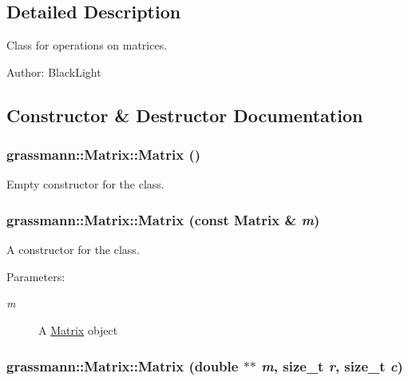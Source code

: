\subsection{Detailed Description}
Class for operations on matrices. 

\begin{Desc}
\item[Author:]BlackLight \end{Desc}


\subsection{Constructor \& Destructor Documentation}
\hypertarget{classgrassmann_1_1Matrix_2e9b599f051c90d4b8ad839bf6ad6640}{
\subsubsection[Matrix]{\setlength{\rightskip}{0pt plus 5cm}grassmann::Matrix::Matrix ()}}
\label{classgrassmann_1_1Matrix_2e9b599f051c90d4b8ad839bf6ad6640}


Empty constructor for the class. 

\hypertarget{classgrassmann_1_1Matrix_cc0d1ad46f484440f5a9bf96f8d8c9b7}{
\subsubsection[Matrix]{\setlength{\rightskip}{0pt plus 5cm}grassmann::Matrix::Matrix (const {\bf Matrix} \& {\em m})}}
\label{classgrassmann_1_1Matrix_cc0d1ad46f484440f5a9bf96f8d8c9b7}


A constructor for the class. 

\begin{Desc}
\item[Parameters:]
\begin{description}
\item[{\em m}]A \hyperlink{classgrassmann_1_1Matrix}{Matrix} object \end{description}
\end{Desc}
\hypertarget{classgrassmann_1_1Matrix_c902b727501ab805b383514480fc9ee6}{
\subsubsection[Matrix]{\setlength{\rightskip}{0pt plus 5cm}grassmann::Matrix::Matrix (double $\ast$$\ast$ {\em m}, \/  size\_\-t {\em r}, \/  size\_\-t {\em c})}}
\label{classgrassmann_1_1Matrix_c902b727501ab805b383514480fc9ee6}


